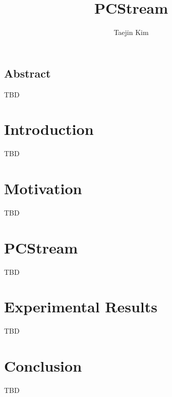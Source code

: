 \documentclass[letterpaper, twocolumn, 10pt]{article}
\begin{document}
\title{
PCStream
}


\author{
Taejin Kim
}

\maketitle

\thispagestyle{empty}

\subsection*{Abstract}
TBD

\section{Introduction}
TBD

\section{Motivation}
TBD

\section{PCStream}
TBD

\section{Experimental Results}
TBD

\section{Conclusion}
TBD
\end{document}
